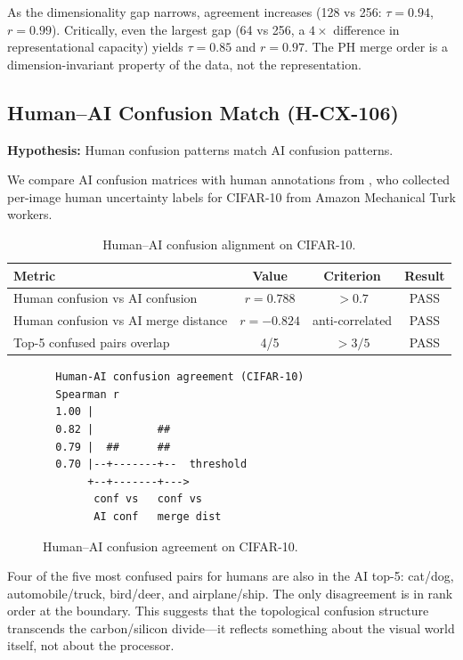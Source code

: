 \documentclass[11pt,a4paper]{article}
\begin{document}
As the dimensionality gap narrows, agreement increases (128 vs 256: $\tau = 0.94$, $r = 0.99$). Critically, even the largest gap (64 vs 256, a $4\times$ difference in representational capacity) yields $\tau = 0.85$ and $r = 0.97$. The PH merge order is a dimension-invariant property of the data, not the representation.

\subsection{Human--AI Confusion Match (H-CX-106)}

\textbf{Hypothesis:} Human confusion patterns match AI confusion patterns.

We compare AI confusion matrices with human annotations from \citet{peterson2019}, who collected per-image human uncertainty labels for CIFAR-10 from Amazon Mechanical Turk workers.

\begin{table}[htbp]
\centering
\caption{Human--AI confusion alignment on CIFAR-10.}
\label{tab:human-ai}
\begin{tabular}{lccc}
\toprule
Metric & Value & Criterion & Result \\
\midrule
Human confusion vs AI confusion       & $r = 0.788$  & $> 0.7$          & PASS \\
Human confusion vs AI merge distance   & $r = -0.824$ & anti-correlated  & PASS \\
Top-5 confused pairs overlap           & 4/5          & $> 3/5$          & PASS \\
\bottomrule
\end{tabular}
\end{table}

\begin{figure}[htbp]
\centering
\begin{verbatim}
  Human-AI confusion agreement (CIFAR-10)
  Spearman r
  1.00 |
  0.82 |          ##
  0.79 |  ##      ##
  0.70 |--+-------+--  threshold
       +--+-------+--->
        conf vs   conf vs
        AI conf   merge dist
\end{verbatim}
\caption{Human--AI confusion agreement on CIFAR-10.}
\label{fig:human-ai}
\end{figure}

Four of the five most confused pairs for humans are also in the AI top-5: cat/dog, automobile/truck, bird/deer, and airplane/ship. The only disagreement is in rank order at the boundary. This suggests that the topological confusion structure transcends the carbon/silicon divide---it reflects something about the visual world itself, not about the processor.
\end{document}
